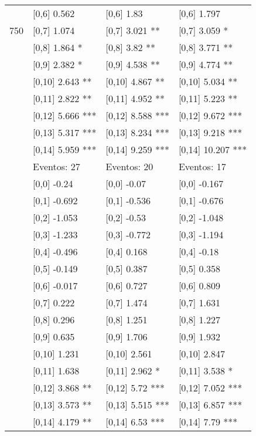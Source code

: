 \begin{table}
\begin{tabular}[t]{llll}
 & {}[0,6] 0.562 & {}[0,6] 1.83 & {}[0,6] 1.797\\
750 & {}[0,7] 1.074 & {}[0,7] 3.021 ** & {}[0,7] 3.059 *\\
\addlinespace
 & {}[0,8] 1.864 * & {}[0,8] 3.82 ** & {}[0,8] 3.771 **\\
 & {}[0,9] 2.382 * & {}[0,9] 4.538 ** & {}[0,9] 4.774 **\\
 & {}[0,10] 2.643 ** & {}[0,10] 4.867 ** & {}[0,10] 5.034 **\\
 & {}[0,11] 2.822 ** & {}[0,11] 4.952 ** & {}[0,11] 5.223 **\\
 & {}[0,12] 5.666 *** & {}[0,12] 8.588 *** & {}[0,12] 9.672 ***\\
\addlinespace
 & {}[0,13] 5.317 *** & {}[0,13] 8.234 *** & {}[0,13] 9.218 ***\\
 & {}[0,14] 5.959 *** & {}[0,14] 9.259 *** & {}[0,14] 10.207 ***\\
 & Eventos:  27 & Eventos:  20 & Eventos:  17\\
 & {}[0,0] -0.24 & {}[0,0] -0.07 & {}[0,0] -0.167\\
 & {}[0,1] -0.692 & {}[0,1] -0.536 & {}[0,1] -0.676\\
\addlinespace
 & {}[0,2] -1.053 & {}[0,2] -0.53 & {}[0,2] -1.048\\
 & {}[0,3] -1.233 & {}[0,3] -0.772 & {}[0,3] -1.194\\
 & {}[0,4] -0.496 & {}[0,4] 0.168 & {}[0,4] -0.18\\
 & {}[0,5] -0.149 & {}[0,5] 0.387 & {}[0,5] 0.358\\
 & {}[0,6] -0.017 & {}[0,6] 0.727 & {}[0,6] 0.809\\
\addlinespace
1000 & {}[0,7] 0.222 & {}[0,7] 1.474 & {}[0,7] 1.631\\
 & {}[0,8] 0.296 & {}[0,8] 1.251 & {}[0,8] 1.227\\
 & {}[0,9] 0.635 & {}[0,9] 1.706 & {}[0,9] 1.932\\
 & {}[0,10] 1.231 & {}[0,10] 2.561 & {}[0,10] 2.847\\
 & {}[0,11] 1.638 & {}[0,11] 2.962 * & {}[0,11] 3.538 *\\
\addlinespace
 & {}[0,12] 3.868 ** & {}[0,12] 5.72 *** & {}[0,12] 7.052 ***\\
 & {}[0,13] 3.573 ** & {}[0,13] 5.515 *** & {}[0,13] 6.857 ***\\
 & {}[0,14] 4.179 ** & {}[0,14] 6.53 *** & {}[0,14] 7.79 ***\\
\bottomrule
\end{tabular}
\end{table}
